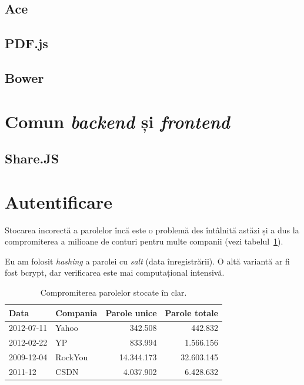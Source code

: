 \documentclass[a4wide,12pt]{report}
\newcommand{\eng}[1]{\emph{#1}} %
\begin{document}
\subsection{Ace}

\subsection{PDF.js}

\subsection{Bower}

\section{Comun \eng{backend} și \eng{frontend}}

\subsection{Share.JS}

\section{Autentificare}

Stocarea incorectă a parolelor încă este o problemă des întâlnită astăzi și a
dus la compromiterea a milioane de conturi pentru multe companii (vezi
tabelul~\ref{paroletab}).

Eu am folosit \eng{hashing} a parolei cu \eng{salt} (data înregistrării). O altă
variantă ar fi fost bcrypt, dar verificarea este mai computațional intensivă.

\begin{table}[hb]
\begin{center}
\begin{tabular}{l l r r}
Data & Compania & Parole unice & Parole totale \\
\hline
2012-07-11 & Yahoo & 342.508 & 442.832 \\
2012-02-22 & YP & 833.994 & 1.566.156 \\
2009-12-04 & RockYou & 14.344.173 & 32.603.145 \\
2011-12 & CSDN & 4.037.902 & 6.428.632 \\
\end{tabular}
\end{center}
\caption{Compromiterea parolelor stocate în clar\cite{passleak}.}
\label{paroletab}
\end{table}
\end{document}
